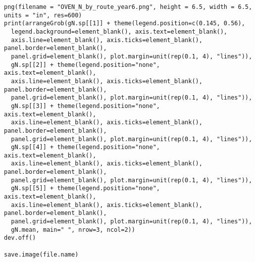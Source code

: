 \documentclass[12pt]{article}
\begin{document}
\begin{verbatim}
png(filename = "OVEN_N_by_route_year6.png", height = 6.5, width = 6.5, units = "in", res=600)
print(arrangeGrob(gN.sp[[1]] + theme(legend.position=c(0.145, 0.56), 
  legend.background=element_blank(), axis.text=element_blank(), 
  axis.line=element_blank(), axis.ticks=element_blank(), panel.border=element_blank(),
  panel.grid=element_blank(), plot.margin=unit(rep(0.1, 4), "lines")),
  gN.sp[[2]] + theme(legend.position="none", axis.text=element_blank(), 
  axis.line=element_blank(), axis.ticks=element_blank(), panel.border=element_blank(),
  panel.grid=element_blank(), plot.margin=unit(rep(0.1, 4), "lines")),
  gN.sp[[3]] + theme(legend.position="none", axis.text=element_blank(), 
  axis.line=element_blank(), axis.ticks=element_blank(), panel.border=element_blank(),
  panel.grid=element_blank(), plot.margin=unit(rep(0.1, 4), "lines")),
  gN.sp[[4]] + theme(legend.position="none", axis.text=element_blank(), 
  axis.line=element_blank(), axis.ticks=element_blank(), panel.border=element_blank(),
  panel.grid=element_blank(), plot.margin=unit(rep(0.1, 4), "lines")),
  gN.sp[[5]] + theme(legend.position="none", axis.text=element_blank(), 
  axis.line=element_blank(), axis.ticks=element_blank(), panel.border=element_blank(),
  panel.grid=element_blank(), plot.margin=unit(rep(0.1, 4), "lines")),
  gN.mean, main=" ", nrow=3, ncol=2))
dev.off()

save.image(file.name)
\end{verbatim}
\end{document}
